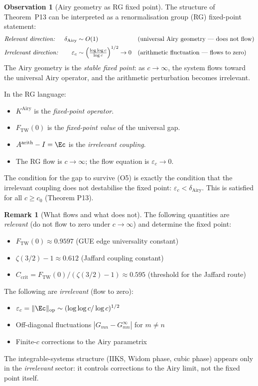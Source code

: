 \documentclass[12pt,a4paper]{amsart}
\theoremstyle{definition}
\newtheorem{remark}[theorem]{Remark}
\newtheorem{observation}[theorem]{Observation}
\newcommand{\KAi}{K^{\mathrm{Airy}}}
\newcommand{\Aarith}{A^{\mathrm{arith}}}
\newcommand{\norm}[1]{\|#1\|}
\begin{document}
\begin{observation}[Airy geometry as RG fixed point]\label{obs:rg}
The structure of Theorem~P13 can be interpreted as a
renormalisation group (RG) fixed-point statement:
\begin{align*}
  &\text{\emph{Relevant direction:}}
    &\delta_{\mathrm{Airy}} &\sim O(1)
    &&\text{(universal Airy geometry --- does not flow)}\\
  &\text{\emph{Irrelevant direction:}}
    &\varepsilon_c &\sim \Bigl(\tfrac{\log\log c}{\log c}\Bigr)^{1/2} \to 0
    &&\text{(arithmetic fluctuation --- flows to zero)}
\end{align*}
The Airy geometry is the \emph{stable fixed point}:
as $c \to \infty$, the system flows toward the universal Airy operator,
and the arithmetic perturbation becomes irrelevant.

In the RG language:
\begin{itemize}
  \item $\KAi$ is the \emph{fixed-point operator}.
  \item $F_{\mathrm{TW}}(0)$ is the \emph{fixed-point value} of the universal gap.
  \item $\Aarith - I = \Ec$ is the \emph{irrelevant coupling}.
  \item The RG flow is $c \to \infty$; the flow equation is $\varepsilon_c \to 0$.
\end{itemize}
The condition for the gap to survive (O5) is exactly the condition
that the irrelevant coupling does not destabilise the fixed point:
$\varepsilon_c < \delta_{\mathrm{Airy}}$.
This is satisfied for all $c \ge c_0$ (Theorem P13).
\end{observation}

\begin{remark}[What flows and what does not]
The following quantities are \emph{relevant} (do not flow to zero
under $c \to \infty$) and determine the fixed point:
\begin{itemize}
  \item $F_{\mathrm{TW}}(0) \approx 0.9597$ (GUE edge universality constant)
  \item $\zeta(3/2) - 1 \approx 0.612$ (Jaffard coupling constant)
  \item $C_{\mathrm{crit}} = F_{\mathrm{TW}}(0)/(\zeta(3/2)-1) \approx 0.595$
    (threshold for the Jaffard route)
\end{itemize}
The following are \emph{irrelevant} (flow to zero):
\begin{itemize}
  \item $\varepsilon_c = \norm{\Ec}_{\mathrm{op}} \sim (\log\log c/\log c)^{1/2}$
  \item Off-diagonal fluctuations $|G_{mn} - G_{mn}^{\infty}|$ for $m \ne n$
  \item Finite-$c$ corrections to the Airy parametrix
\end{itemize}
The integrable-systems structure (IIKS, Widom phase, cubic phase)
appears only in the \emph{irrelevant} sector:
it controls corrections to the Airy limit, not the fixed point itself.
\end{remark}
\end{document}
